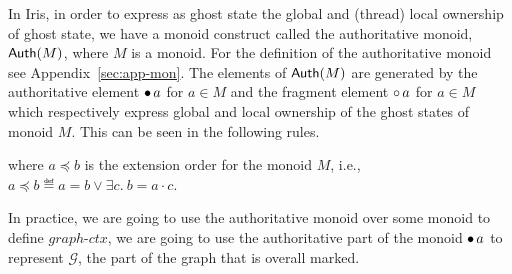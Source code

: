\documentclass[]{scrartcl}
\newcommand{\globprot}{\mathit{graph\text{-}ctx}}
\begin{document}
In Iris, in order to express as ghost state the global and (thread) local
ownership of ghost state, we have a monoid construct called the
authoritative monoid, $\textsf{Auth}(M)$, where $M$ is a monoid.
For the definition of the authoritative monoid see Appendix~\ref{sec:app-mon}.
The elements of $\textsf{Auth}(M)$ are generated by the authoritative element
$\mathord{\bullet}\, a$ for $a \in M$ and the fragment element $\mathord{\circ}\, a$ for $a \in M$
which respectively express global and local ownership of the ghost states of monoid $M$.
This can be seen in the following rules.
where $a \preceq b$ is the extension order for the monoid $M$, i.e., $a \preceq b \eqdef a = b \lor \exists c.~ b = a \cdot c$.

In practice, we are going to use the authoritative monoid over some monoid to define $\globprot$, we are going to use the authoritative part
of the monoid $\mathord{\bullet}\, a$ to represent $\mathcal{G}$, the part of the graph
that is overall marked.
\end{document}
